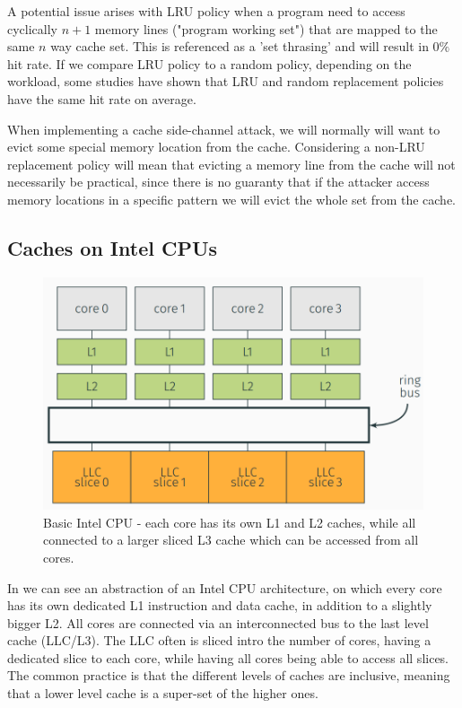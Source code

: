 A potential issue arises with LRU policy when a program need to access cyclically $n+1$ memory lines ("program working set") that are mapped to the same $n$ way cache set. This is referenced as a 'set thrasing' and will result in $0\%$ hit rate. If we compare LRU policy to a random policy, depending on the workload, some studies have shown that LRU and random replacement policies have the same hit rate on average.

When implementing a cache side-channel attack, we will normally will want to evict some special memory location from the cache. Considering a non-LRU replacement policy will mean that evicting a memory line from the cache will not necessarily be practical, since there is no guaranty that if the attacker access memory locations in a specific pattern we will evict the whole set from the cache. 
\subsection{Caches on Intel CPUs}
\label{subsec:cachesonintelcpus}
\begin{figure}
    \centering
    \includegraphics[width=\textwidth]{images/IntelCPU.PNG}
    \caption{Basic Intel CPU - each core has its own L1 and L2 caches, while all connected to a larger sliced L3 cache which can be accessed from all cores. }
    \label{fig:IntelCPU}
\end{figure}

In  we can see an abstraction of an Intel CPU architecture, on which every core has its own dedicated L1 instruction and data cache, in addition to a slightly bigger L2. All cores are connected via an interconnected bus to the last level cache (LLC/L3). The LLC often is sliced intro the number of cores, having a dedicated slice to each core, while having all cores being able to access all slices. The common practice is that the different levels of caches are inclusive, meaning that a lower level cache is a super-set of the higher ones.  

